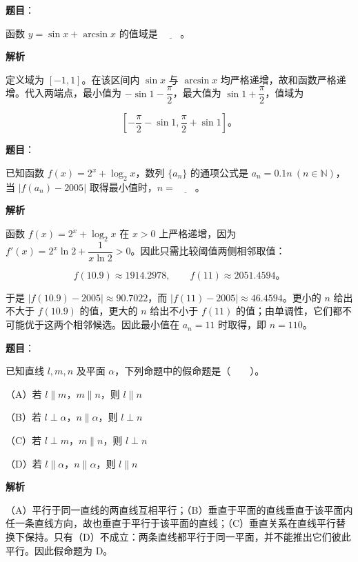 \begin{answer}

\textbf{题目}：

函数 $y=\sin x+\arcsin x$ 的值域是 $\underline{\qquad}$。

\textbf{解析}

定义域为 $[-1,1]$。在该区间内 $\sin x$ 与 $\arcsin x$ 均严格递增，故和函数严格递增。代入两端点，最小值为 $-\sin1-\dfrac\pi2$，最大值为 $\sin1+\dfrac\pi2$，值域为

\nopagebreak[4]
\[
\left[-\frac\pi2-\sin1,\frac\pi2+\sin1\right]\text{。}
\]


\end{answer}
\begin{answer}

\textbf{题目}：

已知函数 $f(x)=2^x+\log_2 x$，数列 $\{a_n\}$ 的通项公式是 $a_n=0.1n\ (n\in\mathbb N)$，当 $\mbox{$\lvert f(a_n)-2005\rvert$}$ 取得最小值时，$n=\underline{\qquad}$。

\textbf{解析}

函数 $f(x)=2^x+\log_2x$ 在 $x>0$ 上严格递增，因为 $f'(x)=2^x\ln2+\dfrac1{x\ln2}>0$。因此只需比较阈值两侧相邻取值：

\nopagebreak[4]
\[
f(10.9)\approx1914.2978,\qquad f(11)\approx2051.4594\text{。}
\]

于是 $|f(10.9)-2005|\approx90.7022$，而 $|f(11)-2005|\approx46.4594$。更小的 $n$ 给出不大于 $f(10.9)$ 的值，更大的 $n$ 给出不小于 $f(11)$ 的值；由单调性，它们都不可能优于这两个相邻候选。因此最小值在 $a_n=11$ 时取得，即 $n=110$。


\end{answer}
\begin{answer}

\textbf{题目}：

已知直线 $l,m,n$ 及平面 $\alpha$，下列命题中的假命题是\mbox{（　　）}。

（A）若 $l\parallel m$，$m\parallel n$，则 $l\parallel n$

（B）若 $l\perp\alpha$，$n\parallel\alpha$，则 $l\perp n$

（C）若 $l\perp m$，$m\parallel n$，则 $l\perp n$

（D）若 $l\parallel\alpha$，$n\parallel\alpha$，则 $l\parallel n$

\textbf{解析}

（A）平行于同一直线的两直线互相平行；（B）垂直于平面的直线垂直于该平面内任一条直线方向，故也垂直于平行于该平面的直线；（C）垂直关系在直线平行替换下保持。只有（D）不成立：两条直线都平行于同一平面，并不能推出它们彼此平行。因此假命题为 D。


\end{answer}
